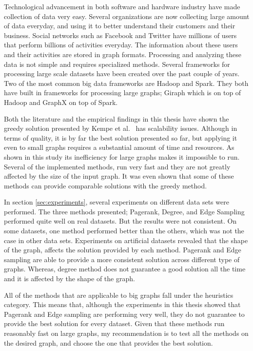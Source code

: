 \documentclass[english]{tktltiki}
\begin{document}
Technological advancement in both software and hardware industry have made collection of data very easy.
Several organizations are now collecting large amount of data everyday, and using it to better understand their customers and their business.
Social networks such as Facebook and Twitter have millions of users that perform billions of activities everyday. 
The information about these users and their activities are stored in graph formats. 
Processing and analyzing these data is not simple and requires specialized methods.
Several frameworks for processing large scale datasets have been created over the past couple of years.
Two of the most common big data frameworks are Hadoop and Spark. 
They both have built in frameworks for processing large graphs; Giraph which is on top of Hadoop and GraphX on top of Spark. 

Both the literature and the empirical findings in this thesis have shown the greedy solution presented by Kempe et al.\ \cite{kempe03} has scalability issues. 
Although in terms of quality, it is by far the best solution presented so far, but applying it even to small graphs requires a substantial amount of time and resources.
As shown in this study its inefficiency for large graphs makes it impossible to run.
Several of the implemented methods, run very fast and they are not greatly affected by the size of the input graph. 
It was even shown that some of these methods can provide comparable solutions with the greedy method.

In section \ref{sec:experiments}, several experiments on different data sets were performed.
The three methods presented; Pagerank, Degree, and Edge Sampling performed quite well on real datasets.
But the results were not consistent. 
On some datasets, one method performed better than the others, which was not the case in other data sets.
Experiments on artificial datasets revealed that the shape of the graph, affects the solution provided by each method.
Pagerank and Edge sampling are able to provide a more consistent solution across different type of graphs.
Whereas, degree method does not guarantee a good solution all the time and it is affected by the shape of the graph.

All of the methods that are applicable to big graphs fall under the heuristics category. 
This means that, although the experiments in this thesis showed that Pagerank and Edge sampling are performing very well, they do not guarantee to provide the best solution for every dataset. 
Given that these methods run reasonably fast on large graphs, my recommendation is to test all the methods on the desired graph, and choose the one that provides the best solution.
\end{document}
